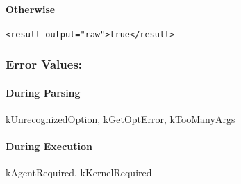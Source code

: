 \paragraph*{Otherwise}
\begin{verbatim}
<result output="raw">true</result>
\end{verbatim}
\subsubsection*{Error Values:}
\paragraph*{During Parsing}
 kUnrecognizedOption, kGetOptError, kTooManyArgs
\paragraph*{During Execution}
 kAgentRequired, kKernelRequired
